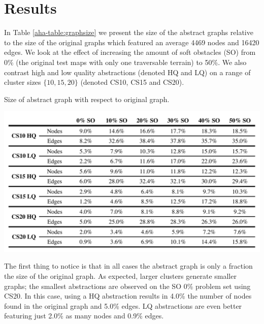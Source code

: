 \section{Results}
\label{aha:results}
In Table \ref{aha-table:graphsize} we present the size of the abstract graphs relative to the size of the original graphs which featured an average 4469 nodes and 16420 edges. 
We look at the effect of increasing the amount of soft obstacles (SO) from 0\% (the original test maps with only one traversable terrain) to 50\%.
We also contrast high and low quality abstractions (denoted HQ and LQ) on a range of cluster sizes $\lbrace 10, 15, 20 \rbrace$ (denoted CS10, CS15 and CS20).
\begin{table}[htbp]
       \caption{Size of abstract graph with respect to original graph. }
	\vspace{-15pt}
       \begin{center}
                       \includegraphics[scale=0.35, trim = 20mm 14mm 20mm 0mm]{diagrams/graphsize.pdf}
       \end{center}
       \label{aha-table:graphsize}
\end{table}
\par \indent
The first thing to notice is that in all cases the abstract graph is only a fraction the size of the original graph.
As expected, larger clusters generate smaller graphs; the smallest abstractions are observed on the SO 0\% problem set using CS20. 
In this case, using a HQ abstraction results in 4.0\% the number of nodes found in the original graph and 5.0\% edges. 
LQ abstractions are even better featuring just 2.0\% as many nodes and 0.9\% edges.
\par \indent
